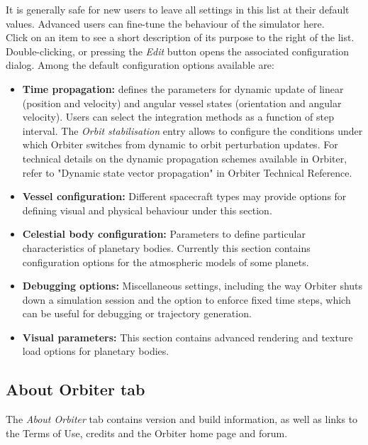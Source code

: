 \documentclass[Orbiter User Manual.tex]{subfiles}
\begin{document}
\begin{figure}[H]
	\centering
\end{figure}

\noindent
It is generally safe for new users to leave all settings in this list at their default values. Advanced users can fine-tune the behaviour of the simulator here.\\
Click on an item to see a short description of its purpose to the right of the list. Double-clicking, or pressing the \textit{Edit} button opens the associated configuration dialog. Among the default configuration options available are:

\begin{itemize}
\item \textbf{Time propagation:} defines the parameters for dynamic update of linear (position and velocity) and angular vessel states (orientation and angular velocity). Users can select the integration methods as a function of step interval. The \textit{Orbit stabilisation} entry allows to configure the conditions under which Orbiter switches from dynamic to orbit perturbation updates. For technical details on the dynamic propagation schemes available in Orbiter, refer to "Dynamic state vector propagation" in Orbiter Technical Reference.
\item \textbf{Vessel configuration:} Different spacecraft types may provide options for defining visual and physical behaviour under this section.
\item \textbf{Celestial body configuration:} Parameters to define particular characteristics of planetary bodies. Currently this section contains configuration options for the atmospheric models of some planets.
\item \textbf{Debugging options:} Miscellaneous settings, including the way Orbiter shuts down a simulation session and the option to enforce fixed time steps, which can be useful for debugging or trajectory generation.
\item \textbf{Visual parameters:} This section contains advanced rendering and texture load options for planetary bodies.
\end{itemize}


\subsection{About Orbiter tab}
The \textit{About Orbiter} tab contains version and build information, as well as links to the Terms of Use, credits and the Orbiter home page and forum.

\begin{figure}[H]
	\centering
\end{figure}
\end{document}
